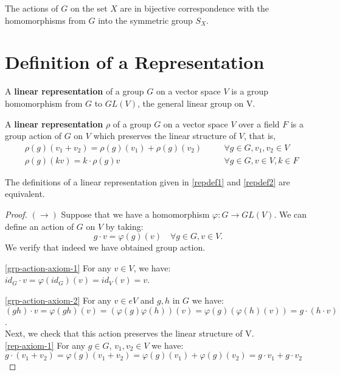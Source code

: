 \begin{prop} 
The actions of $G$ on the set $X$ are in bijective correspondence with the homomorphisms from $G$ into the symmetric group $S_X$.
\end{prop}


\section{Definition of a Representation}
\begin{defn}
\label{repdef1}
A \textbf{linear representation} of a group $G$ on a vector space $V$  is a group homomorphism from $G$ to $GL(V)$, the general linear group on V. \end{defn}
 

\begin{defn}\label{repdef2}A \textbf{linear representation} $\rho$ of a group $G$ on a vector space $V$ over a field $F$ is a group action of $G$ on $V$ which preserves the linear structure of $V$, that is, 
\begin{align}
\label{rep-axiom-1}&\rho(g)(v_1+v_2)=\rho(g)(v_1)+\rho(g)(v_2) \quad && \forall g \in G, v_1, v_2 \in V \\
\label{rep-axiom-2}&\rho(g)(kv) = k \cdot \rho(g)v \quad && \forall g \in G, v \in V, k \in F
\end{align}
 \end{defn}
 
 \begin{prop}
The definitions of a linear representation given in \ref{repdef1} and \ref{repdef2} are equivalent.
 \end{prop}
 \begin{proof}
 $(\rightarrow)$  Suppose that we have a homomorphism $\varphi : G \to GL(V)$.  We can define an action of $G$ on $V$ by taking: \[g \cdot v = \varphi(g)(v) \quad \forall g \in G, v \in V.\]
We verify that indeed we have obtained group action.

\ref{grp-action-axiom-1} For any $v \in V$, we have: $ id_G \cdot v = \varphi(id_G) (v)= id_V (v) = v$. 

\ref{grp-action-axiom-2} For any $v \in eV$ and $g,h$ in $G$ we have: $(gh) \cdot v = \varphi(gh) (v) = (\varphi(g) \varphi(h)) (v)= \varphi(g) (\varphi(h) (v))= g \cdot (h \cdot v)$.\\
Next, we check that this action preserves the linear structure of V.\\
\ref{rep-axiom-1} For any $g \in G$, $v_1, v_2 \in V$ we have: $g \cdot (v_1 +  v_2) = \varphi(g) (v_1 + v_2) = \varphi(g)(v_1) + \varphi(g)(v_2)= g \cdot v_1 + g \cdot v_2$


 \end{proof}


